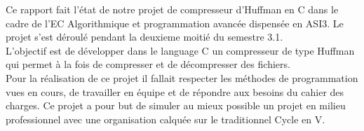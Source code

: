 Ce rapport fait l'\'{e}tat de notre projet de compresseur d'Huffman en  C dans le cadre de l'EC Algorithmique et programmation avanc\'{e}e dispens\'{e}e en ASI3.
Le projet s'est d\'{e}roul\'{e} pendant la deuxieme moiti\'{e} du semestre 3.1.\\

L'objectif est de d\'{e}velopper dans le language C un compresseur de type Huffman qui permet à la fois de compresser et de d\'{e}compresser des fichiers.\\

Pour la r\'{e}alisation de ce projet il fallait respecter les m\'{e}thodes de programmation vues en cours, de travailler en \'{e}quipe et de r\'{e}pondre aux besoins du cahier des charges. Ce projet a pour but de simuler au mieux possible un projet en milieu professionnel avec une organisation calqu\'{e}e sur le traditionnel Cycle en V.  \\
